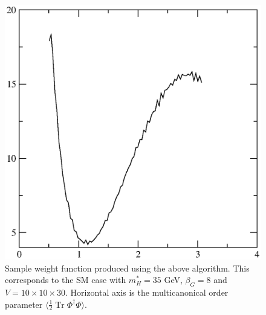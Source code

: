 \documentclass[11pt,a4paper]{article}
\newcommand\Tr{\operatorname{Tr}}
\begin{document}
\begin{figure}[H]
\centering
	\includegraphics[scale=0.5]{weight}
	\caption{Sample weight function produced using the above algorithm. This corresponds to the SM case with $m_H^* = 35$ GeV, $\beta_G = 8$ and $V = 10\times 10\times 30$. Horizontal axis is the multicanonical order parameter $\langle\frac12 \Tr\Phi^\dagger\Phi\rangle$. }
	\label{fig:weight}
\end{figure}
\end{document}
